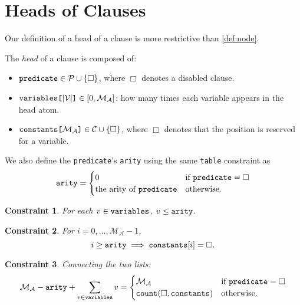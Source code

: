 \documentclass[runningheads]{llncs}
\newtheorem{constraint}{Constraint}
\newcommand{\variable}[1]{\texttt{\textup{#1}}}
\newcommand{\arrayd}[3]{\variable{{#1}[}{#2}\variable{]} \in {#3}}
\newcommand{\predicates}{\mathcal{P}}
\newcommand{\variables}{\mathcal{V}}
\newcommand{\constants}{\mathcal{C}}
\newcommand{\maxArity}{\mathcal{M}_{\mathcal{A}}}
\begin{document}
\section{Heads of Clauses}

Our definition of a head of a clause is more restrictive than \cref{def:node}.

\begin{definition} %
  The \emph{head} of a clause is composed of:
  \begin{itemize}
  \item $\variable{predicate} \in \predicates \cup \{ \Box \}$, where $\Box$
    denotes a disabled clause.
  \item $\arrayd{variables}{|\variables{}|}{[0, \maxArity{}]}$: how many times
    each variable appears in the head atom.
  \item $\arrayd{constants}{\maxArity{}}{\constants{} \cup \{ \Box \}}$, where
    $\Box$ denotes that the position is reserved for a variable.
  \end{itemize}
  We also define the \variable{predicate}'s \variable{arity} using the same
  \variable{table} constraint as
  \[
    \variable{arity} = \begin{cases}
      0 & \text{if } \variable{predicate} = \Box\\
      \text{the arity of } \variable{predicate} & \text{otherwise.}
    \end{cases}
  \]
\end{definition}

\begin{constraint}
  For each $v \in \variable{variables}$, $v \le \variable{arity}$.
\end{constraint}

\begin{constraint}
  For $i = 0, \dots, \maxArity{} - 1$,
  \[
    i \ge \variable{arity} \implies \variable{constants}[i] = \Box.
  \]
\end{constraint}

\begin{constraint}
  Connecting the two lists:
  \[
    \maxArity{} - \variable{arity} + \sum_{v \in \variable{variables}} v
    = \begin{cases}
      \maxArity{} & \text{if } \variable{predicate} = \Box \\
      \variable{count}(\Box, \variable{constants}) & \text{otherwise}.
      \end{cases}
  \]
\end{constraint}
\end{document}
